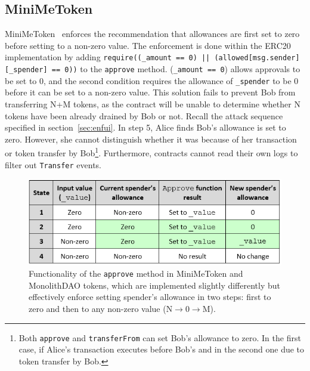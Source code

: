 
\subsection{MiniMeToken}\label{sec:MiniMeToken}

MiniMeToken~\cite{Ref15} enforces the recommendation that allowances are first set to zero before setting to a non-zero value. The enforcement is done within the ERC20 implementation by adding \texttt{require((\_amount == 0) || (allowed[msg.sender][\_spender] == 0))} to the \texttt{approve} method. (\texttt{\_amount == 0}) allows approvals to be set to 0, and the second condition requires the allowance of \texttt{\_spender} to be 0 before it can be set to a non-zero value. This solution fails to prevent Bob from transferring N+M tokens, as the contract will be unable to determine whether N tokens have been already drained by Bob or not. Recall the attack sequence specified in section~\ref{sec:enfui}. In step 5, Alice finds Bob's allowance is set to zero. However, she cannot distinguish whether it was because of her transaction or token transfer by Bob\footnote{Both \texttt{approve} and \texttt{transferFrom} can set Bob's allowance to zero. In the first case, if Alice's transaction executes before Bob's and in the second one due to token transfer by Bob.}. Furthermore, contracts cannot read their own logs to filter out \texttt{Transfer} events.


\begin{figure}[t]
	\centering
	\includegraphics[width=1.0\linewidth]{figures/multiple_withdrawal_09.png}
	\caption{Functionality of the \texttt{approve} method in MiniMeToken and MonolithDAO tokens, which are implemented slightly differently but effectively enforce setting spender's allowance in two steps: first to zero and then to any non-zero value (\eg N$\rightarrow$0$\rightarrow$M).\label{fig:dao}}
\end{figure}

